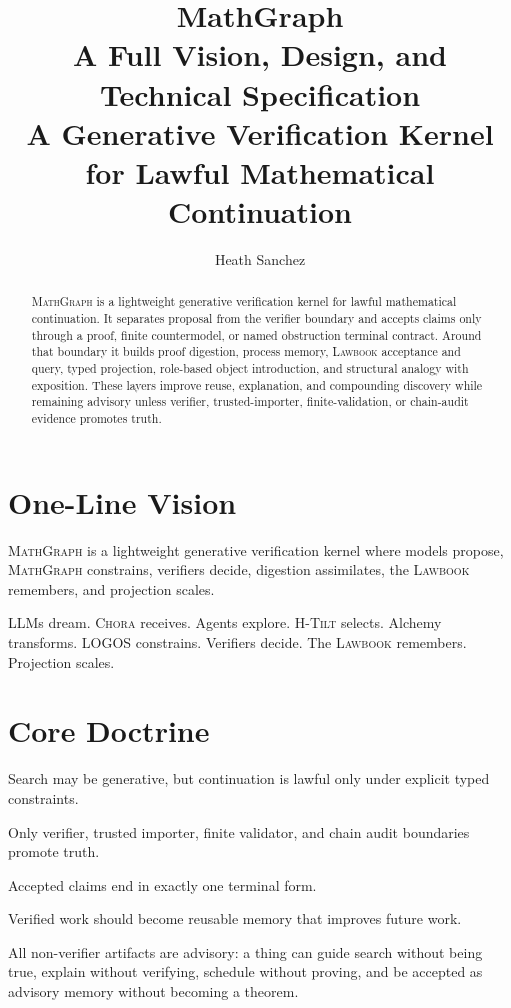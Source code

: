 \documentclass[11pt,a4paper]{article}
\title{\textbf{MathGraph}\\A Full Vision, Design, and Technical Specification\\\large A Generative Verification Kernel for Lawful Mathematical Continuation}
\author{Heath Sanchez}
\date{}
\newcommand{\MG}{\textsc{MathGraph}}
\newcommand{\LOGOS}{\textsc{LOGOS}}
\newcommand{\Chora}{\textsc{Chora}}
\newcommand{\Lawbook}{\textsc{Lawbook}}
\newcommand{\HTilt}{\textsc{H-Tilt}}
\begin{document}
\maketitle
\begin{abstract}
\MG{} is a lightweight generative verification kernel for lawful mathematical continuation. It separates proposal from the verifier boundary and accepts claims only through a proof, finite countermodel, or named obstruction terminal contract. Around that boundary it builds proof digestion, process memory, \Lawbook{} acceptance and query, typed projection, role-based object introduction, and structural analogy with exposition. These layers improve reuse, explanation, and compounding discovery while remaining advisory unless verifier, trusted-importer, finite-validation, or chain-audit evidence promotes truth.
\end{abstract}

\section{One-Line Vision}
\MG{} is a lightweight generative verification kernel where models propose, \MG{} constrains, verifiers decide, digestion assimilates, the \Lawbook{} remembers, and projection scales.

\noindent LLMs dream. \Chora{} receives. Agents explore. \HTilt{} selects. Alchemy transforms. \LOGOS{} constrains. Verifiers decide. The \Lawbook{} remembers. Projection scales.

\section{Core Doctrine}
\begin{description}[style=nextline]
\item[Continuation Under Constraint] Search may be generative, but continuation is lawful only under explicit typed constraints.
\item[Verifier Boundary] Only verifier, trusted importer, finite validator, and chain audit boundaries promote truth.
\item[Terminal Contract] Accepted claims end in exactly one terminal form.
\item[Compounding] Verified work should become reusable memory that improves future work.
\item[Advisory / Truth Separation] All non-verifier artifacts are advisory: a thing can guide search without being true, explain without verifying, schedule without proving, and be accepted as advisory memory without becoming a theorem.
\end{description}
\end{document}
